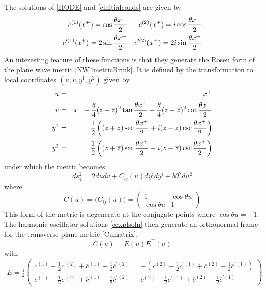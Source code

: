 The solutions of \eqref{HODE} and \eqref{cinitialconds} are given by
\begin{eqnarray}
  \label{cexplsoln}
  c^{(1)}(x^+) = \cos\frac{\theta x^+}2 &&
  c^{(2)}(x^+) =  i \cos\frac{\theta x^+}2   \nonumber\\
  c^{\prime (1)}(x^+) = 2\sin\frac{\theta x^+}2 &&
  c^{\prime (2)}(x^+) = 2 i \sin\frac{\theta x^+}2  
\end{eqnarray}
An interesting feature of these functions is that they generate the Rosen form
\cite{Rosen1} of the plane wave metric \eqref{NW4metricBrink}. It is defined by
the transformation to local coordinates $(u,v,y^1,y^2)$ given by
\begin{eqnarray}
  \label{Rosen}
  u&=&x^+   \nonumber\\v&=&x^--\frac\theta4 (z+\overline{z} )^2 
  \tan\frac{\theta x^+}2-\frac\theta4 (z-\overline{z} )^2 
  \cot\frac{\theta x^+}2    \nonumber\\y^1&=&\frac12  
  \left((z+\overline{z} )\sec\frac{\theta x^+}2 + i (z-\overline{z} )
    \csc\frac{\theta x^+}2 \right)   \nonumber\\y^2&=&\frac12  
  \left((z+\overline{z} )\sec\frac{\theta x^+}2 - i (z-\overline{z} )
    \csc\frac{\theta x^+}2 \right)  
\end{eqnarray}
under which the metric becomes
\begin{equation}
  \label{NW4metricRosen}
  d s_4^2=2  d u  d v+C_{ij}(u)  d y^i  d y^j+b \theta^2  d u^2
\end{equation}
where
\begin{equation}
  \label{Cumatrix}
  C(u)=\bigl(C_{ij}(u)\bigr)=
  \begin{pmatrix}
    1&\cos\theta u\\\cos\theta u&1
  \end{pmatrix}  
\end{equation}
This form of the metric is degenerate at the conjugate points where $\cos\theta
u=\pm 1$. The harmonic oscillator solutions \eqref{cexplsoln} then generate an
orthonormal frame for the transverse plane metric \eqref{Cumatrix},
\begin{equation}
  \label{CQrel}
  C(u)=E(u) E^\top(u)  
\end{equation}
with
\begin{eqnarray}
  \label{Qvielbein}
  E=\frac12
  \begin{pmatrix}c^{(1)}+\frac12  c^{\prime (2)}+
    \overline{c}^{ (1)}+\frac12  \overline{c}^{ \prime
      (2)}& &-\left(c^{(2)}-\frac12  c^{\prime (1)}+
      \overline{c}^{ (2)}-\frac12  \overline{c}^{ \prime
        (1)}\right)\\c^{(1)}+\frac12  c^{\prime (2)}+
    \overline{c}^{ (1)}+\frac12  \overline{c}^{ \prime
      (2)}& &c^{(2)}-\frac12  c^{\prime (1)}+
    \overline{c}^{ (2)}-\frac12  \overline{c}^{ \prime(1)}
  \end{pmatrix}
\end{eqnarray}
